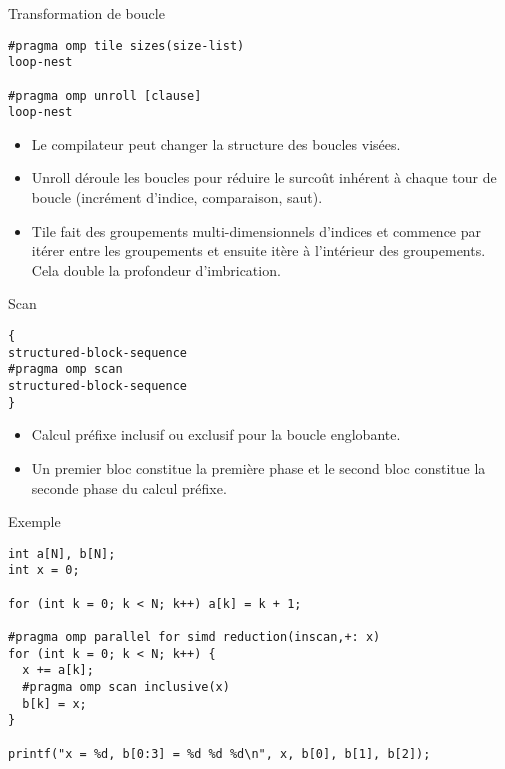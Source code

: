 \documentclass[10pt]{beamer}
\begin{document}
\begin{frame}[fragile]{Transformation de boucle}

  \begin{verbatim}
#pragma omp tile sizes(size-list)
loop-nest

#pragma omp unroll [clause]
loop-nest
  \end{verbatim}

  \begin{itemize}
    \item Le compilateur peut changer la structure des boucles visées.

    \item Unroll déroule les boucles pour réduire le surcoût inhérent à chaque tour de boucle (incrément d'indice, comparaison, saut).
    
    \item Tile fait des groupements multi-dimensionnels d'indices et commence par itérer entre les groupements et ensuite itère à l'intérieur des groupements. Cela double la profondeur d'imbrication.
    
  \end{itemize}
\end{frame}

\begin{frame}[fragile]{Scan}

  \begin{verbatim}
{
structured-block-sequence
#pragma omp scan
structured-block-sequence
}
  \end{verbatim}

  \begin{itemize}
    \item Calcul préfixe inclusif ou exclusif pour la boucle englobante.

    \item Un premier bloc constitue la première phase et le second bloc constitue la seconde phase du calcul préfixe.
  \end{itemize}
\end{frame}

\begin{frame}[fragile]{Exemple}

  \scriptsize
  \begin{verbatim}
int a[N], b[N];
int x = 0;

for (int k = 0; k < N; k++) a[k] = k + 1;

#pragma omp parallel for simd reduction(inscan,+: x)
for (int k = 0; k < N; k++) {
  x += a[k];
  #pragma omp scan inclusive(x)
  b[k] = x;
}

printf("x = %d, b[0:3] = %d %d %d\n", x, b[0], b[1], b[2]);
  \end{verbatim}
\end{frame}
\end{document}
